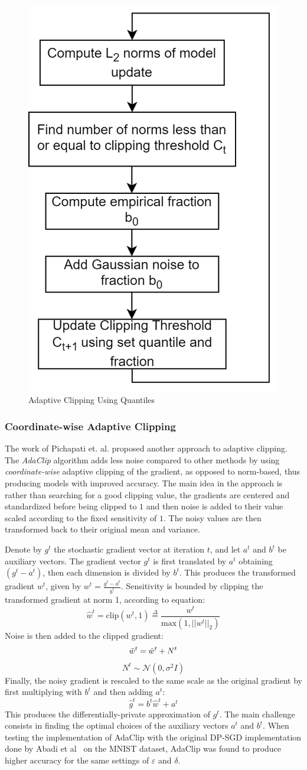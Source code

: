 \begin{figure}[h]
\centering
    \includegraphics[width=0.3\linewidth]{submissions/submission5/figs/Quantile Estimation.png}
   \caption{Adaptive Clipping Using Quantiles}\label{FigDiff}
   \label{AdaptiveClipping}
\end{figure} 

\subsubsection{Coordinate-wise Adaptive Clipping}
The work of Pichapati et. al.\cite{RefWorks:RefID:35-pichapati2019adaclip:} proposed another approach to adaptive clipping. The {\em AdaClip} algorithm adds less noise compared to other methods by using {\em coordinate-wise} adaptive clipping of the gradient, as opposed to norm-based, thus producing models with improved accuracy. The main idea in the approach is rather than searching for a good clipping value, the gradients are centered and standardized before being clipped to $1$ and then noise is added to their value scaled according to the fixed sensitivity of $1$. The noisy values are then transformed back to their original mean and variance. 

Denote by $g^t$ the stochastic gradient vector at iteration $t$, and let $a^t$ and $b^t$ be auxiliary vectors. The gradient vector $g^t$ is first translated by $a^t$ obtaining $(g^t-a^t)$, then each dimension is divided by $b^t$. This produces the transformed gradient $w^t$, given by $w^t=\frac{g^t-a^t}{b^t}$. Sensitivity is bounded by clipping the transformed gradient at norm 1, according to equation:
\[ \hat{w}^t=\text{clip}(w^t,1)\overset{\Delta}{=}\frac{w^t}{\text{max}(1,||w^t||_2)}\]
Noise is then added to the clipped gradient:
\[ \Tilde{w}^t=\hat{w}^t+N^t\] \[ N^t\sim\mathcal{N}(0,\sigma^2I)\]
Finally, the noisy gradient is rescaled to the same scale as the original gradient by first multiplying with $b^t$ and then adding $a^t$:
\[ \hat{g}^t=b^t\hat{w}^t+a^t\]
This produces the differentially-private approximation of $g^t$. The main challenge consists in finding the optimal choices of the auxiliary vectors $a^t$ and $b^t$. When testing the implementation of AdaClip with the original DP-SGD implementation done by Abadi et al~\cite{RefWorks:RefID:40-abadi2016deep} on the MNIST dataset, AdaClip was found to produce higher accuracy for the same settings of $\varepsilon$ and $\delta$.


